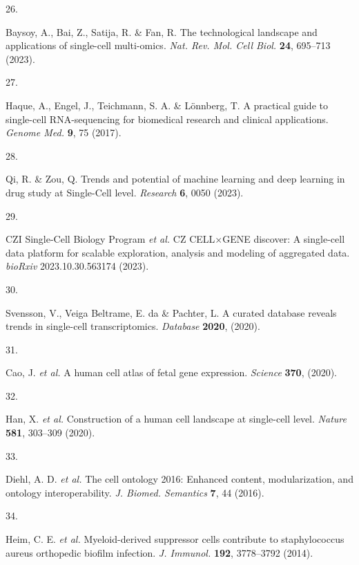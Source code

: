 \documentclass[
]{agujournal2019}
\newlength{\cslhangindent}
\newlength{\csllabelwidth}
\newenvironment{CSLReferences}[2] %
 {\begin{list}{}{%
  \setlength{\itemindent}{0pt}
  \setlength{\leftmargin}{0pt}
  \setlength{\parsep}{0pt}
  \ifodd #1
   \setlength{\leftmargin}{\cslhangindent}
   \setlength{\itemindent}{-1\cslhangindent}
  \fi
  \setlength{\itemsep}{#2\baselineskip}}}
 {\end{list}}
\newcommand{\CSLLeftMargin}[1]{\parbox[t]{\csllabelwidth}{\strut#1\strut}}
\newcommand{\CSLRightInline}[1]{\parbox[t]{\linewidth - \csllabelwidth}{\strut#1\strut}}
\begin{document}
\begin{CSLReferences}{0}{0}
\CSLLeftMargin{26. }%
\CSLRightInline{Baysoy, A., Bai, Z., Satija, R. \& Fan, R. The
technological landscape and applications of single-cell multi-omics.
\emph{Nat. Rev. Mol. Cell Biol.} \textbf{24}, 695--713 (2023).}

\CSLLeftMargin{27. }%
\CSLRightInline{Haque, A., Engel, J., Teichmann, S. A. \& Lönnberg, T. A
practical guide to single-cell {RNA-sequencing} for biomedical research
and clinical applications. \emph{Genome Med.} \textbf{9}, 75 (2017).}

\CSLLeftMargin{28. }%
\CSLRightInline{Qi, R. \& Zou, Q. Trends and potential of machine
learning and deep learning in drug study at {Single-Cell} level.
\emph{Research} \textbf{6}, 0050 (2023).}

\CSLLeftMargin{29. }%
\CSLRightInline{CZI Single-Cell Biology Program \emph{et al.} {CZ}
{CELL\(\times\)GENE} discover: A single-cell data platform for scalable
exploration, analysis and modeling of aggregated data. \emph{bioRxiv}
2023.10.30.563174 (2023).}

\CSLLeftMargin{30. }%
\CSLRightInline{Svensson, V., Veiga Beltrame, E. da \& Pachter, L. A
curated database reveals trends in single-cell transcriptomics.
\emph{Database} \textbf{2020}, (2020).}

\CSLLeftMargin{31. }%
\CSLRightInline{Cao, J. \emph{et al.} A human cell atlas of fetal gene
expression. \emph{Science} \textbf{370}, (2020).}

\CSLLeftMargin{32. }%
\CSLRightInline{Han, X. \emph{et al.} Construction of a human cell
landscape at single-cell level. \emph{Nature} \textbf{581}, 303--309
(2020).}

\CSLLeftMargin{33. }%
\CSLRightInline{Diehl, A. D. \emph{et al.} The cell ontology 2016:
Enhanced content, modularization, and ontology interoperability.
\emph{J. Biomed. Semantics} \textbf{7}, 44 (2016).}

\CSLLeftMargin{34. }%
\CSLRightInline{Heim, C. E. \emph{et al.} Myeloid-derived suppressor
cells contribute to staphylococcus aureus orthopedic biofilm infection.
\emph{J. Immunol.} \textbf{192}, 3778--3792 (2014).}


\end{CSLReferences}
\end{document}
